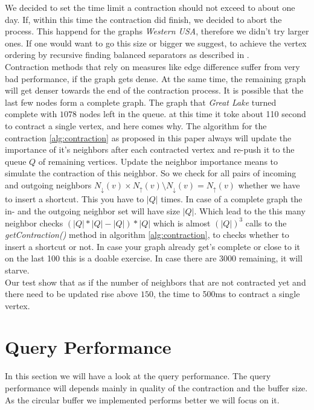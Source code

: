 We decided to set the time limit a contraction should not exceed to about one day. If, within this time the contraction did finish, we decided to abort the process. This happend for the graphs \textit{Western USA}, therefore we didn't try larger ones. If one would want to go this size or bigger we suggest,
to achieve the vertex ordering by recursive finding balanced separators as described in \cite[Customization Contraction Hierarchies]{CCH}. 
\\
Contraction methods that rely on measures like edge difference suffer from very bad performance, if the graph gets dense. At the same time, the remaining graph will get denser towards the end of the contraction process. It is possible  that the last few nodes form a complete graph. The graph that \textit{Great Lake} turned complete with $1078$ nodes left in the queue. 
at this time it toke about 110 second to contract a single vertex, and here comes why. The algorithm for the contraction \ref{alg:contraction}
as proposed in this paper always will update the importance  of it's neighbors  after each contracted vertex and re-push it to the queue $Q$ of remaining vertices. Update the neighbor importance means to simulate the contraction of this neighbor. So we check for all pairs of incoming and outgoing neighbors $N_\downarrow(v) \times N_\uparrow(v) \setminus N_\downarrow(v) = N_\uparrow(v)$ whether we have to insert a shortcut. 
This you have to $|Q|$ times. In case of a complete graph the in- and the outgoing neighbor set will have size $|Q|$. Which lead to the this many neighbor checks $(|Q| * |Q| - |Q|)*|Q|$ which is almost $(|Q|)^3$ calls to the \textit{getContraction()} method in algorithm \ref{alg:contraction}, to checks whether to insert a shortcut or not. In case your graph already get's complete or close to it on the last 
100 this is a doable exercise. In case there are 3000 remaining, it will starve. 
\\
Our test show that as if the number of neighbors that are not contracted yet and there need to be updated rise above $150$, the time to 500ms to contract a single vertex.


\section{Query Performance}



In this section we will have a look at the query performance. The query performance will depends mainly in quality of the contraction and the buffer size. 
As the circular buffer we implemented performs better we will focus on it. 
\\ 

